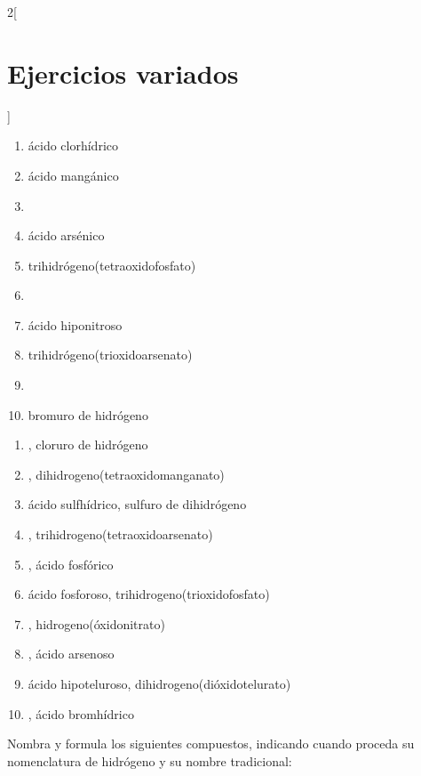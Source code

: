 \documentclass[10pt]{article}
\begin{document}
\begin{multicols*}{2}[
  \section{Ejercicios variados}
  ]
\begin{exercise}[
  tags    = {inorgánica,ácidos,ácidos binarios,ácidos ternarios,oxoácidos},
  topics  = {química inorgánica,formulación,nomenclatura},
  source  = {SAN Formulación, p28, e35},
  ]
  \begin{enumerate}
    \item ácido clorhídrico
    \item ácido mangánico
    \item {}
    \item ácido arsénico
    \item trihidrógeno(tetraoxidofosfato)
    \item {}
    \item ácido hiponitroso
    \item trihidrógeno(trioxidoarsenato)
    \item {}
    \item bromuro de hidrógeno
  \end{enumerate}
\end{exercise}

\begin{solution}
  \begin{enumerate}
    \item {}, cloruro de hidrógeno
    \item {}, dihidrogeno(tetraoxidomanganato)
    \item ácido sulfhídrico, sulfuro de dihidrógeno
    \item {}, trihidrogeno(tetraoxidoarsenato)
    \item {}, ácido fosfórico
    \item ácido fosforoso, trihidrogeno(trioxidofosfato)
    \item {}, hidrogeno(óxidonitrato)
    \item {}, ácido arsenoso
    \item ácido hipoteluroso, dihidrogeno(dióxidotelurato)
    \item {}, ácido bromhídrico
  \end{enumerate}
\end{solution}




\begin{exercise}[
    tags    = {inorgánica,ácidos,ácidos binarios,ácidos ternarios,oxoácidos},
    topics  = {química inorgánica,formulación,nomenclatura},
    source  = {SAN Formulación, p28, e36},
  ]
  Nombra y formula los siguientes compuestos, indicando cuando proceda su nomenclatura de hidrógeno y su nombre tradicional:


\end{exercise}
\end{multicols*}
\end{document}
